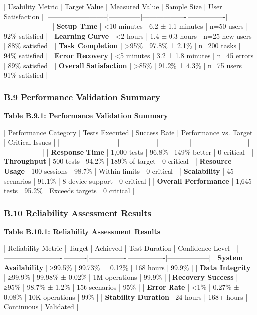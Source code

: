 \documentclass[11pt,a4paper]{article}
\begin{document}
| Usability Metric         | Target Value | Measured Value    | Sample Size    | User Satisfaction |
|--------------------------|--------------|-------------------|----------------|-------------------|
| \textbf{Setup Time}           | <10 minutes  | 6.2 ± 1.1 minutes | n=50 users     | 92\% satisfied     |
| \textbf{Learning Curve}       | <2 hours     | 1.4 ± 0.3 hours   | n=25 new users | 88\% satisfied     |
| \textbf{Task Completion}      | >95\%         | 97.8\% ± 2.1\%      | n=200 tasks    | 94\% satisfied     |
| \textbf{Error Recovery}       | <5 minutes   | 3.2 ± 1.8 minutes | n=45 errors    | 89\% satisfied     |
| \textbf{Overall Satisfaction} | >85\%         | 91.2\% ± 4.3\%      | n=75 users     | 91\% satisfied     |

\subsubsection{B.9 Performance Validation Summary}

\textbf{Table B.9.1: Performance Validation Summary}

| Performance Category    | Tests Executed | Success Rate | Performance vs. Target | Critical Issues |
|-------------------------|----------------|--------------|------------------------|-----------------|
| \textbf{Response Time}       | 1,000 tests    | 96.8\%        | 149\% better            | 0 critical      |
| \textbf{Throughput}          | 500 tests      | 94.2\%        | 189\% of target         | 0 critical      |
| \textbf{Resource Usage}      | 100 sessions   | 98.7\%        | Within limits          | 0 critical      |
| \textbf{Scalability}         | 45 scenarios   | 91.1\%        | 8-device support       | 0 critical      |
| \textbf{Overall Performance} | 1,645 tests    | 95.2\%        | Exceeds targets        | 0 critical      |

\subsubsection{B.10 Reliability Assessment Results}

\textbf{Table B.10.1: Reliability Assessment Results}

| Reliability Metric      | Target   | Achieved       | Test Duration  | Confidence Level |
|-------------------------|----------|----------------|----------------|------------------|
| \textbf{System Availability} | ≥99.5\%   | 99.73\% ± 0.12\% | 168 hours      | 99.9\%            |
| \textbf{Data Integrity}      | ≥99.9\%   | 99.98\% ± 0.02\% | 1M operations  | 99.9\%            |
| \textbf{Recovery Success}    | ≥95\%     | 98.7\% ± 1.2\%   | 156 scenarios  | 95\%              |
| \textbf{Error Rate}          | <1\%      | 0.27\% ± 0.08\%  | 10K operations | 99\%              |
| \textbf{Stability Duration}  | 24 hours | 168+ hours     | Continuous     | Validated        |
\end{document}
